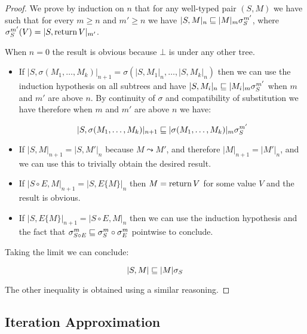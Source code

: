 \begin{proof}
    We prove by induction on $n$ that for any well-typed pair $(S,M)$ we have 
    such that for every $m \geq n$ and $m' \geq n$ 
    we have $|S,M|_n \sqsubseteq |M|_m \sigma^{m'}_S$, where 
    $\sigma^{m'}_S (V) = |S, \operatorname{return} V|_{m'}$.

    When $n=0$ the result is obvious because $\bot$ is under any other tree.

    \begin{itemize}
        \item If $|S,\sigma(M_1, \dots, M_k)|_{n+1} = \sigma (|S,M_1|_n, \dots,
            |S, M_k|_n)$ then we can use the induction hypothesis on all 
            subtrees and have $|S, M_i|_n \sqsubseteq |M_i|_m \sigma^{m'}_S$ when 
            $m$ and $m'$ are above $n$. By continuity of $\sigma$ and 
            compatibility of substitution we have therefore when $m$ and $m'$
            are above $n$ we have:

            \begin{equation*}
                |S, \sigma (M_1, \dots, M_k)|_{n+1} \sqsubseteq |\sigma(M_1, \dots,
                M_k)|_m \sigma^{m'}_S
            \end{equation*}

        \item If $|S, M|_{n+1} = |S, M'|_n$ because $M \leadsto M'$, and 
            therefore $|M|_{n+1} = |M'|_n$, and we can use this to trivially
            obtain the desired result.

        \item If $|S \circ E, M|_{n+1} = |S, E \{M\}|_n$ then 
            $M = \operatorname{return} V$ for some value $V$ and the result is obvious.

        \item If $|S, E\{M\}|_{n+1} = |S \circ E, M|_n$ then 
            we can use the induction hypothesis and the fact that 
            $\sigma^m_{S \circ E} \sqsubseteq \sigma^m_S \circ \sigma^m_E$ pointwise
            to conclude.
    \end{itemize}
    
    Taking the limit we can conclude:

    \begin{equation*}
        |S,M| \sqsubseteq |M| \sigma_S
    \end{equation*}
    
    The other inequality is obtained using a similar reasoning. 
\end{proof}


\subsection{Iteration Approximation}

